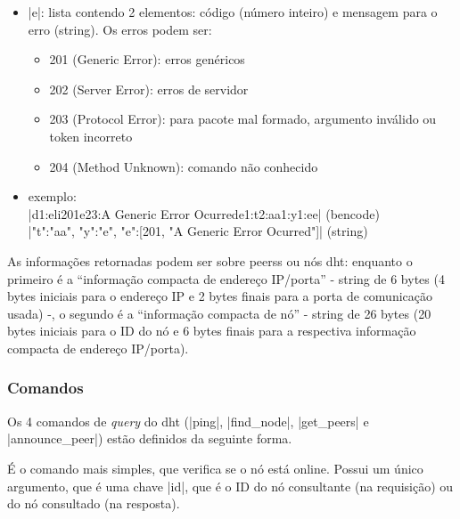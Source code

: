 \begin{itemize}
\begin{itemize}
\begin{itemize}
            \item \bverb|e|: lista contendo 2 elementos: código (número inteiro) e
                mensagem para o erro (\gls*{string}). Os erros podem ser:
                \begin{itemize}
                    \item 201 (Generic Error): erros genéricos
                    \item 202 (Server Error): erros de servidor
                    \item 203 (Protocol Error): para pacote mal formado, argumento
                        inválido ou token incorreto
                    \item 204 (Method Unknown): comando não conhecido
                \end{itemize}

            \item exemplo: \\
                \bverb|d1:eli201e23:A Generic Error Ocurrede1:t2:aa1:y1:ee|
                (\gls*{bencode}) \\
                \sverb|{"t":"aa", "y":"e", "e":[201, "A Generic Error Ocurred"]}|
                (\gls*{string})
        \end{itemize}
\end{itemize}

As informações retornadas podem ser sobre \glspl*{peers} ou nós \gls{dht}: enquanto o
primeiro é a \enquote{informação compacta de endereço IP/porta} - string de 6 bytes (4
bytes iniciais para o endereço IP e 2 bytes finais para a porta de comunicação usada)
-, o segundo é a \enquote{informação compacta de nó} - string de 26 bytes (20 bytes
iniciais para o ID do nó e 6 bytes finais para a respectiva informação compacta de
endereço IP/porta).

\subsubsection*{Comandos}

Os 4 comandos de \emph{query} do \gls*{dht} (\bverb|ping|, \bverb|find_node|,
\bverb|get_peers| e \bverb|announce_peer|) estão definidos da seguinte forma.

{}

É o comando mais simples, que verifica se o nó está online. Possui um único argumento,
que é uma chave \bverb|id|, que é o ID do nó consultante (na requisição) ou do nó
consultado (na resposta).


\end{itemize}
